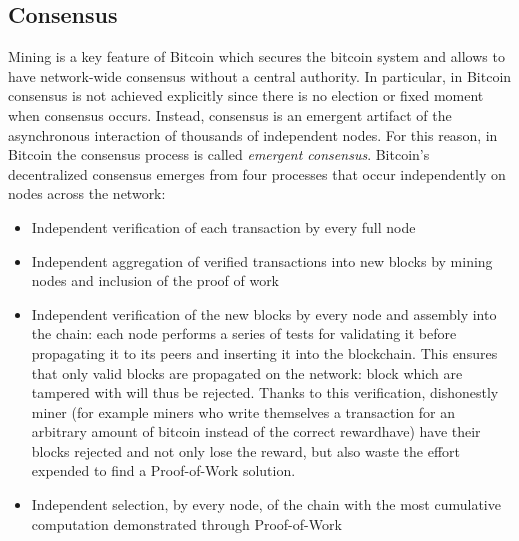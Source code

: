 \subsection{Consensus} Mining is a key feature of Bitcoin which secures the
bitcoin system and allows to have network-wide consensus without a central
authority. In particular, in Bitcoin consensus is not achieved explicitly since
there is no election or fixed moment when consensus occurs. Instead, consensus
is an emergent artifact of the asynchronous interaction of thousands of
independent nodes. For this reason, in Bitcoin the consensus process is called
\emph{emergent consensus}. Bitcoin’s decentralized consensus emerges from
four processes that occur independently on nodes across the network:
\begin{itemize}
  \item Independent verification of each transaction by every full node
  \item Independent aggregation of verified transactions into new blocks by mining
  nodes and inclusion of the proof of work
  \item Independent verification of the new blocks by every node and assembly
  into the chain: each node performs a series of tests for validating it before
  propagating it to its peers and inserting it into the blockchain.
  This ensures that only valid blocks are propagated on the network: block which
  are tampered with will thus be rejected.
  Thanks to this verification, dishonestly miner (for example miners who write
  themselves a transaction for an arbitrary amount of bitcoin instead of the correct rewardhave)
  have their blocks rejected and not only lose the reward, but also waste the
  effort expended to find a Proof-of-Work solution.
  \item Independent selection, by every node, of the chain with the most
  cumulative computation demonstrated through Proof-of-Work
\end{itemize}


